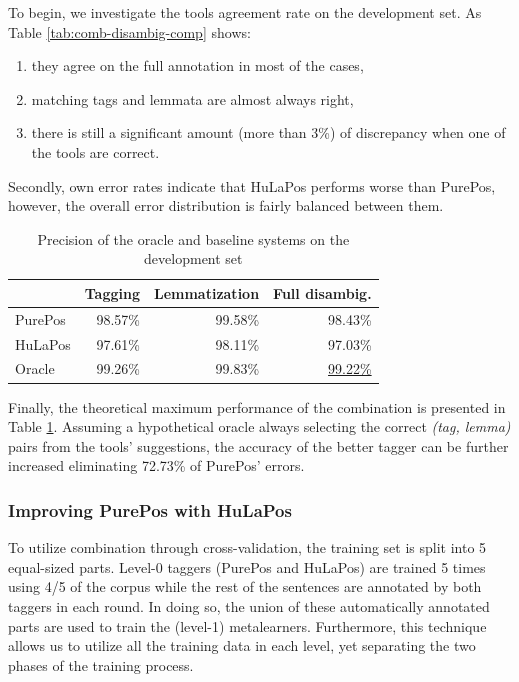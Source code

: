 To begin, we investigate the tools agreement rate on the development set.
As Table \ref{tab:comb-disambig-comp} shows:
\begin{enumerate}
 \item they agree on the full annotation in most of the cases,
 \item matching tags and lemmata are almost always right,
 \item there is still a significant amount (more than 3\%) of discrepancy when one of the tools are correct.
\end{enumerate}

Secondly, own error rates indicate that HuLaPos performs worse than PurePos, however, the overall error distribution is fairly balanced between them. 

\begin{table}[h]
\centering
\caption{Precision of the oracle and baseline systems on the development set}\label{tab:comb-disambig-acc}
\begin{tabular}{l r r r}
\hline
& Tagging & Lemmatization & Full disambig. \\
\hline
PurePos & 98.57\% & 99.58\% & 98.43\% \\
HuLaPos & 97.61\% & 98.11\% & 97.03\% \\
Oracle & 99.26\% & 99.83\% & \underline{99.22\%} \\
\hline
\end{tabular}
\end{table}

Finally, the theoretical maximum performance of the combination is presented in Table \ref{tab:comb-disambig-acc}.
Assuming a hypothetical oracle always selecting the correct \emph{(tag, lemma)} pairs from the tools' suggestions, the accuracy of the better tagger can be further increased eliminating 72.73\% of PurePos' errors. 

\subsubsection{Improving PurePos with HuLaPos}

To utilize combination through cross-validation, the training set is split into 5 equal-sized parts.
Level-0 taggers (PurePos and HuLaPos) are trained 5 times using 4/5 of the corpus while the rest of the sentences are annotated by both taggers in each round.
In doing so, the union of these automatically annotated parts are used to train the (level-1) metalearners.
Furthermore, this technique allows us to utilize all the training data in each level, yet separating the two phases of the training process. 

